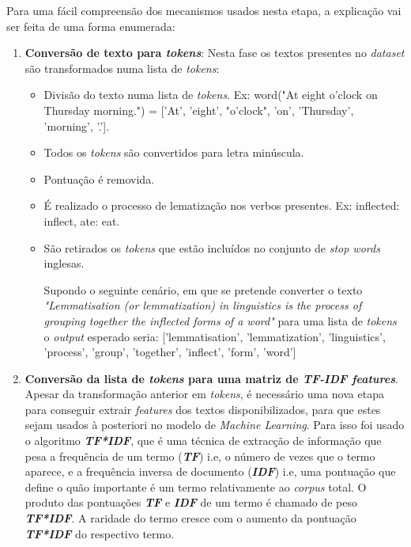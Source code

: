 Para uma fácil compreensão dos mecanismos usados nesta etapa, a explicação vai ser feita de uma forma enumerada:
\begin{enumerate}
\item \textbf{Conversão de texto para \textit{tokens}}: Nesta fase os textos presentes no \textit{dataset} são transformados numa lista de \textit{tokens}:
\begin{itemize}
\item Divisão do texto numa lista de \textit{tokens}. Ex: word("At eight o'clock on Thursday morning.") = ['At', 'eight', "o'clock", 'on', 'Thursday', 'morning', '.'].
\item Todos os \textit{tokens} são convertidos para letra minúscula.
\item Pontuação é removida.
\item É realizado o processo de lematização nos verbos presentes. Ex: inflected: inflect, ate: eat.
\item São retirados os \textit{tokens} que estão incluídos no conjunto de \textit{stop words} inglesas.

\bigbreak
Supondo o seguinte cenário, em que se pretende converter o texto \textit{"Lemmatisation (or lemmatization) in linguistics is the process of grouping together the inflected forms of a word"} para uma lista de \textit{tokens} o \textit{output} esperado seria: ['lemmatisation', 'lemmatization', 'linguistics', 'process', 'group', 'together', 'inflect', 'form', 'word']
\end{itemize}

\bigbreak
\item \textbf{Conversão da lista de \textit{tokens} para uma matriz de \textit{TF-IDF features}}.
Apesar da transformação anterior em \textit{tokens}, é necessário uma nova etapa para conseguir extrair \textit{features} dos textos disponibilizados, para que estes sejam usados à posteriori no modelo de \textit{Machine Learning}. Para isso foi usado o algoritmo \textit{\textbf{TF*IDF}}, que é uma técnica de extracção de informação que pesa a frequência de um termo (\textbf{\textit{TF}}) i.e, o número de vezes que o termo aparece, e a frequência inversa de documento (\textbf{\textit{IDF}}) i.e, uma pontuação que define o quão importante é um termo relativamente ao \textit{corpus} total. O produto das pontuações \textbf{\textit{TF}} e \textbf{\textit{IDF}} de um termo é chamado de peso \textbf{\textit{TF*IDF}}. A raridade do termo cresce com o aumento da pontuação \textbf{\textit{TF*IDF}} do respectivo termo.


\end{enumerate}
